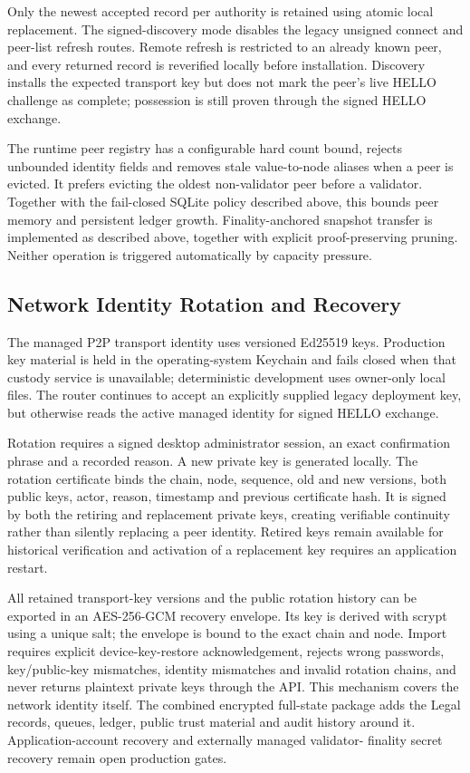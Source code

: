 Only the newest accepted record per authority is retained using atomic local
replacement. The signed-discovery mode disables the legacy unsigned connect
and peer-list refresh routes. Remote refresh is restricted to an already known
peer, and every returned record is reverified locally before installation.
Discovery installs the expected transport key but does not mark the peer's live
HELLO challenge as complete; possession is still proven through the signed
HELLO exchange.

The runtime peer registry has a configurable hard count bound, rejects
unbounded identity fields and removes stale value-to-node aliases when a peer is
evicted. It prefers evicting the oldest non-validator peer before a validator.
Together with the fail-closed SQLite policy described above, this bounds peer
memory and persistent ledger growth. Finality-anchored snapshot transfer is
implemented as described above, together with explicit proof-preserving
pruning. Neither operation is triggered automatically by capacity pressure.

\subsection{Network Identity Rotation and Recovery}

The managed P2P transport identity uses versioned Ed25519 keys. Production key
material is held in the operating-system Keychain and fails closed when that
custody service is unavailable; deterministic development uses owner-only local
files. The router continues to accept an explicitly supplied legacy deployment
key, but otherwise reads the active managed identity for signed HELLO exchange.

Rotation requires a signed desktop administrator session, an exact confirmation
phrase and a recorded reason. A new private key is generated locally. The
rotation certificate binds the chain, node, sequence, old and new versions,
both public keys, actor, reason, timestamp and previous certificate hash. It is
signed by both the retiring and replacement private keys, creating verifiable
continuity rather than silently replacing a peer identity. Retired keys remain
available for historical verification and activation of a replacement key
requires an application restart.

All retained transport-key versions and the public rotation history can be
exported in an AES-256-GCM recovery envelope. Its key is derived with
scrypt using a unique salt; the envelope is bound to the exact chain and node.
Import requires explicit device-key-restore acknowledgement, rejects wrong
passwords, key/public-key mismatches, identity mismatches and invalid rotation
chains, and never returns plaintext private keys through the API. This mechanism
covers the network identity itself. The combined encrypted full-state package
adds the Legal records, queues, ledger, public trust material and audit history
around it. Application-account recovery and externally managed validator-
finality secret recovery remain open production gates.

